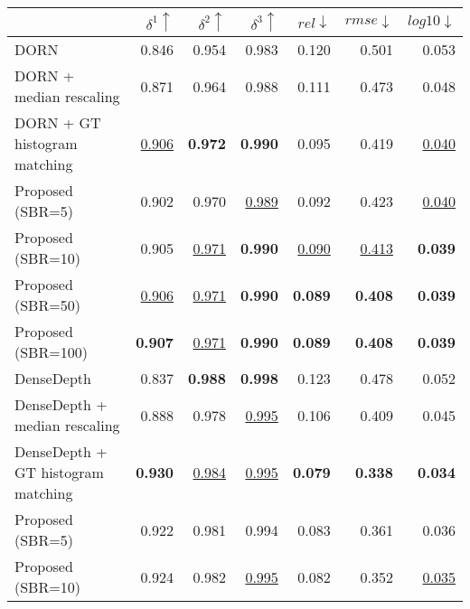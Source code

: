 { \footnotesize
\begin{tabular}{lrrr|rrr}
\toprule
{} & $\delta^1 \uparrow$ & $\delta^2 \uparrow$ & $\delta^3 \uparrow$ &   $rel \downarrow$ &  $rmse \downarrow$ & $log10 \downarrow$ \\
\midrule
DORN                               &               0.846 &               0.954 &               0.983 &              0.120 &              0.501 &              0.053 \\
DORN + median rescaling            &               0.871 &               0.964 &               0.988 &              0.111 &              0.473 &              0.048 \\
DORN + GT histogram matching       &   \underline{0.906} &      \textbf{0.972} &      \textbf{0.990} &              0.095 &              0.419 &  \underline{0.040} \\
Proposed (SBR=5)                   &               0.902 &               0.970 &   \underline{0.989} &              0.092 &              0.423 &  \underline{0.040} \\
Proposed (SBR=10)                  &               0.905 &   \underline{0.971} &      \textbf{0.990} &  \underline{0.090} &  \underline{0.413} &     \textbf{0.039} \\
Proposed (SBR=50)                  &   \underline{0.906} &   \underline{0.971} &      \textbf{0.990} &     \textbf{0.089} &     \textbf{0.408} &     \textbf{0.039} \\
Proposed (SBR=100)                 &      \textbf{0.907} &   \underline{0.971} &      \textbf{0.990} &     \textbf{0.089} &     \textbf{0.408} &     \textbf{0.039} \\
\midrule
DenseDepth                         &               0.837 &      \textbf{0.988} &      \textbf{0.998} &              0.123 &              0.478 &              0.052 \\
DenseDepth + median rescaling      &               0.888 &               0.978 &   \underline{0.995} &              0.106 &              0.409 &              0.045 \\
DenseDepth + GT histogram matching &      \textbf{0.930} &   \underline{0.984} &   \underline{0.995} &     \textbf{0.079} &     \textbf{0.338} &     \textbf{0.034} \\
Proposed (SBR=5)                   &               0.922 &               0.981 &               0.994 &              0.083 &              0.361 &              0.036 \\
Proposed (SBR=10)                  &               0.924 &               0.982 &   \underline{0.995} &              0.082 &              0.352 &  \underline{0.035} \\

\end{tabular}}
